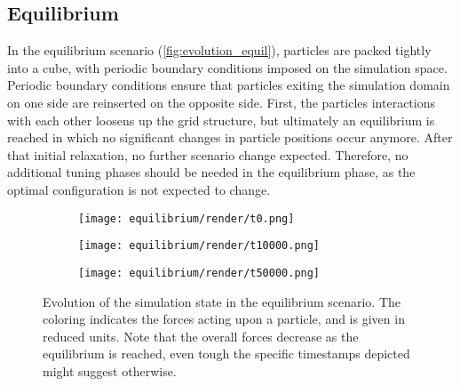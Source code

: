 \newcommand{\fastcolorbarhor}{%
	\centering
	\begin{tikzpicture}
		\node[anchor=east, align=center] at (-0.25cm,-0.25cm) {\si{F^{*}}};
		\pgfplotscolorbardrawstandalone[
			colorbar horizontal,
			colormap name=fast,
			point meta min=0,
			point meta max=50,
			colorbar style={
					width=3cm,
					xtick={0,10,...,50},
					tick align=outside,
					tick pos=top,
					xticklabel pos=top,
				},
		]
	\end{tikzpicture}
}


\subsection{Equilibrium}
\label{subsec:scenario_equil}
In the equilibrium scenario (\autoref{fig:evolution_equil}), particles are packed tightly into a cube, with periodic boundary conditions imposed on the simulation space. Periodic boundary conditions ensure that particles exiting the simulation domain on one side are reinserted on the opposite side. First, the particles interactions with each other loosens up the grid structure, but ultimately an equilibrium is reached in which no significant changes in particle positions occur anymore. After that initial relaxation, no further scenario change expected. Therefore, no additional tuning phases should be needed in the equilibrium phase, as the optimal configuration is not expected to change.

\begin{figure}[htpb]
	\centering
	\begin{subfigure}[c]{.3\textwidth}
		\texttt{[image: equilibrium/render/t0.png]}
	\end{subfigure}%
	\begin{subfigure}[c]{.3\textwidth}
		\texttt{[image: equilibrium/render/t10000.png]}
	\end{subfigure}%
	\begin{subfigure}[c]{.3\textwidth}
		\texttt{[image: equilibrium/render/t50000.png]}
	\end{subfigure}%
	\hfill\begin{subfigure}[c]{.08\textwidth}
		\fastcolorbar
	\end{subfigure}
	\caption{Evolution of the simulation state in the equilibrium scenario. The coloring indicates the forces acting upon a particle, and is given in reduced units. Note that the overall forces decrease as the equilibrium is reached, even tough the specific timestamps depicted might suggest otherwise.}
	\label{fig:evolution_equil}
\end{figure}


